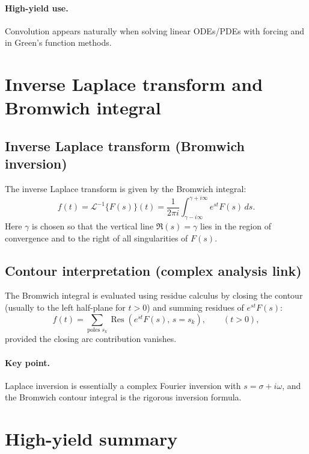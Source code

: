 \paragraph{High-yield use.}
Convolution appears naturally when solving linear ODEs/PDEs with forcing
and in Green's function methods.


\section{Inverse Laplace transform and Bromwich integral}

\subsection{Inverse Laplace transform (Bromwich inversion)}
The inverse Laplace transform is given by the Bromwich integral:
\begin{equation}
\boxed{
f(t) = \mathcal{L}^{-1}\{F(s)\}(t)
=
\frac{1}{2\pi i}\int_{\gamma-i\infty}^{\gamma+i\infty}
e^{st}F(s)\,ds.
}
\end{equation}
Here $\gamma$ is chosen so that the vertical line $\Re(s)=\gamma$
lies in the region of convergence and to the right of all singularities of $F(s)$.

\subsection{Contour interpretation (complex analysis link)}
The Bromwich integral is evaluated using residue calculus by closing the contour
(usually to the left half-plane for $t>0$) and summing residues of $e^{st}F(s)$:
\begin{equation}
f(t) = \sum_{\text{poles }s_k}\operatorname{Res}\left(e^{st}F(s),\,s=s_k\right),
\qquad (t>0),
\end{equation}
provided the closing arc contribution vanishes.

\paragraph{Key point.}
Laplace inversion is essentially a complex Fourier inversion with $s=\sigma+i\omega$,
and the Bromwich contour integral is the rigorous inversion formula.


\section{High-yield summary}

